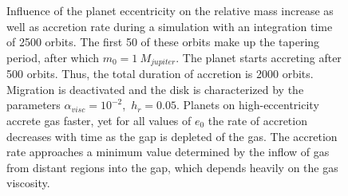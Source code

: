         \begin{figure}[h!]
          \centering
          \begin{minipage}{.5\linewidth}
            \centering
          \end{minipage}%
          \begin{minipage}{.5\linewidth}
            \centering
          \end{minipage}
          \caption{
            Influence of the planet eccentricity on the relative mass 
            increase as well as accretion rate during a simulation with 
            an integration time of 2500 orbits. The first 50 of these orbits 
            make up the tapering period, after which $m_0=1\ M_{jupiter}$.
            The planet starts 
            accreting after 500 orbits. Thus, the total duration of accretion 
            is 2000 orbits. Migration is
            deactivated and the disk is characterized by the parameters 
            $\alpha_{visc}=10^{-2}$,\ $h_r=0.05$.
            Planets on high-eccentricity accrete gas faster, yet for all 
            values of $e_0$ the rate of accretion decreases with time as the 
            gap is depleted of the gas. The accretion rate approaches a 
            minimum value determined by the inflow of gas from distant 
            regions into the gap, which depends heavily on the gas viscosity.
          }
          \label{fig:mpm0_and_acc_vs_t_and_ecc}
        \end{figure} \ \\

%       
%        

